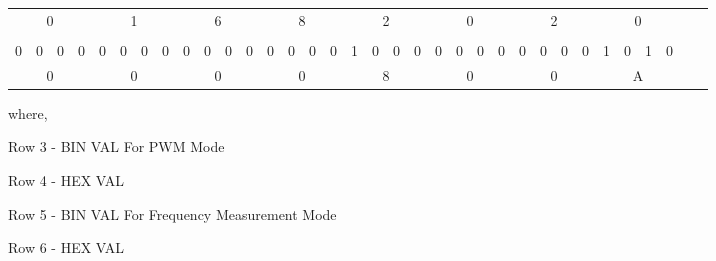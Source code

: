 \documentclass[12pt]{article}
\begin{document}
\begin{table}[h!]
\begin{center}
\begin{adjustbox}{width=\textwidth}
\begin{tabular}{ cccccccccccccccccccccccccccccccccc }
\multicolumn{4}{|c|}{0} & \multicolumn{4}{c|}{1} & \multicolumn{4}{c|}{6} & \multicolumn{4}{c|}{8} & \multicolumn{4}{c|}{2} & \multicolumn{4}{c|}{0} & \multicolumn{4}{c|}{2} & \multicolumn{4}{c|}{0}  \\ \cline{1-32}

& & & & & & & & & & & & & & & & & & & & & & & & & & & & & & &  \\ \cline{1-32}

\multicolumn{1}{|c}{0} & \multicolumn{1}{|c|}{0} & \multicolumn{1}{c}{0} & \multicolumn{1}{c|}{0} & \multicolumn{1}{c|}{0} & \multicolumn{1}{c|}{0} & \multicolumn{1}{c|}{0} & \multicolumn{1}{c|}{0} & \multicolumn{1}{c|}{0} & \multicolumn{1}{c|}{0} & \multicolumn{1}{c|}{0} & \multicolumn{1}{c}{0} & \multicolumn{1}{c}{0} & \multicolumn{1}{c|}{0} & \multicolumn{1}{c|}{0} & \multicolumn{1}{c}{0} & \multicolumn{1}{c}{1} & \multicolumn{1}{c}{0} & \multicolumn{1}{c}{0} & \multicolumn{1}{c}{0} & \multicolumn{1}{c|}{0} & \multicolumn{1}{c}{0} & \multicolumn{1}{c|}{0} & \multicolumn{1}{c}{0} & \multicolumn{1}{c|}{0} & \multicolumn{1}{c}{0} & \multicolumn{1}{c}{0} & \multicolumn{1}{c|}{0} & \multicolumn{1}{c}{1} & \multicolumn{1}{c}{0} & \multicolumn{1}{c}{1} & \multicolumn{1}{c|}{0}   \\ \cline{1-32}

\multicolumn{4}{|c|}{0} & \multicolumn{4}{c|}{0} & \multicolumn{4}{c|}{0} & \multicolumn{4}{c|}{0} & \multicolumn{4}{c|}{8} & \multicolumn{4}{c|}{0} & \multicolumn{4}{c|}{0} & \multicolumn{4}{c|}{A}  \\ \cline{1-32}

 
\end{tabular}
\end{adjustbox}


\end{center}

\end{table}

where, 

\begin{itemize*}



\item Row 3 - BIN VAL For PWM Mode
\item Row 4 - HEX VAL
\item Row 5 - BIN VAL For Frequency Measurement Mode
\item Row 6 - HEX VAL


\end{itemize*}
\end{document}
